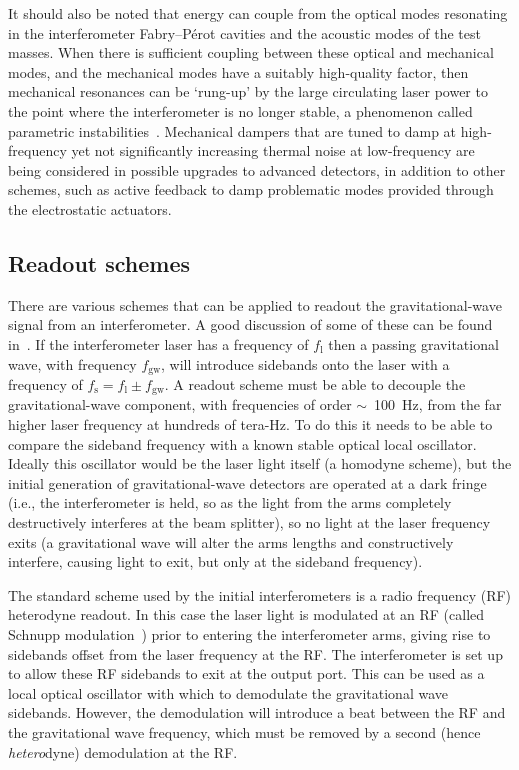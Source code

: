 It should also be noted that energy can couple from the optical modes resonating
in the interferometer Fabry--P\'{e}rot cavities and the acoustic modes of the test
masses. When there is sufficient coupling between these optical and mechanical
modes, and the mechanical modes have a suitably high-quality factor, then
mechanical resonances can be `rung-up' by the large circulating laser power to
the point where the interferometer is no longer stable, a phenomenon called
parametric instabilities~\cite{Braginsky:2001}. Mechanical dampers that are
tuned to damp at high-frequency yet not significantly increasing thermal noise
at low-frequency are being considered in possible upgrades to advanced
detectors, in addition to other schemes, such as active feedback to damp
problematic modes provided through the electrostatic actuators.


\subsection{Readout schemes}
\label{sec:readout} 

There are various schemes that can be applied to readout the
gravitational-wave signal from an interferometer. A good discussion of
some of these can be found in~\cite{Hild:2009}. If the interferometer
laser has a frequency of $f_{\mathrm{l}}$ then a passing
gravitational wave, with frequency $f_{\mathrm{gw}}$, will introduce
sidebands onto the laser with a frequency of $f_{\mathrm{s}} =
f_{\mathrm{l}} \pm f_{\mathrm{gw}}$. A readout scheme must be able to
decouple the gravitational-wave component, with frequencies of order
$\sim$~100~Hz, from the far higher laser frequency at hundreds of
tera-Hz. To do this it needs to be able to compare the sideband
frequency with a known stable optical local oscillator. Ideally this
oscillator would be the laser light itself (a homodyne scheme), but
the initial generation of gravitational-wave detectors are operated at
a dark fringe (i.e., the interferometer is held, so as the light from
the arms completely destructively interferes at the beam splitter), so
no light at the laser frequency exits (a gravitational wave will alter
the arms lengths and constructively interfere, causing light to exit,
but only at the sideband frequency).


The standard scheme used by the initial interferometers is a radio frequency (RF) heterodyne
readout. In this case the laser light is modulated at an RF
(called Schnupp modulation~\cite{Schnupp:1988}) prior to entering the
interferometer arms, giving rise to sidebands offset from the laser frequency at
the RF. The interferometer is set up to allow these RF sidebands to exit at
the output port. This can be used as a local optical oscillator with which to
demodulate the gravitational wave sidebands. However, the demodulation will
introduce a beat between the RF and the gravitational wave frequency, which must
be removed by a second (hence \textit{hetero}dyne) demodulation at the RF.


